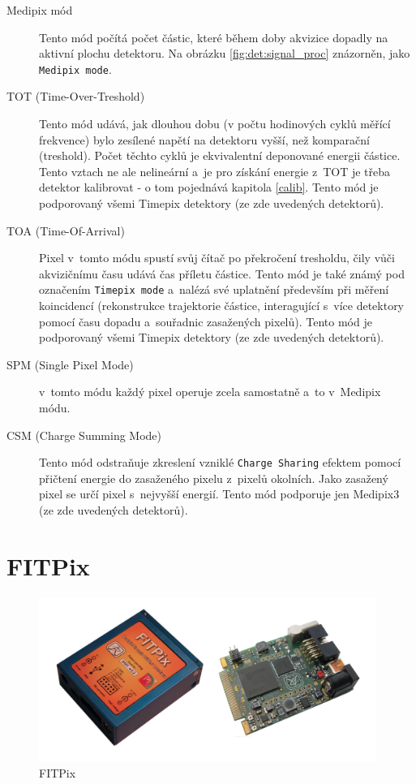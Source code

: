 \begin{description}
	\item[Medipix mód] Tento mód počítá počet částic, které během doby akvizice dopadly na aktivní plochu detektoru. Na obrázku \ref{fig:det:signal_proc} znázorněn, jako \texttt{Medipix mode}.
	\item[TOT (Time-Over-Treshold)] Tento mód udává, jak dlouhou dobu (v počtu hodinových cyklů měřící frekvence) bylo zesílené napětí na detektoru vyšší, než komparační (treshold). Počet těchto cyklů je ekvivalentní deponované energii částice. Tento vztach ne ale nelineární a~je pro získání energie z~TOT je třeba detektor kalibrovat - o tom pojednává kapitola \ref{calib}. Tento mód je podporovaný všemi Timepix detektory (ze zde uvedených detektorů).
	\item[TOA (Time-Of-Arrival)] Pixel v~tomto módu spustí svůj čítač po překročení tresholdu, čily vůči akvizičnímu času udává čas příletu částice. Tento mód je také známý pod označením \texttt{Timepix mode} a~nalézá své uplatnění především při měření koincidencí (rekonstrukce trajektorie částice, interagující s~více detektory pomocí času dopadu a~souřadnic zasažených pixelů). Tento mód je podporovaný všemi Timepix detektory (ze zde uvedených detektorů).
	\item[SPM (Single Pixel Mode)] v~tomto módu každý pixel operuje zcela samostatně a~to v~Medipix módu.
	\item[CSM (Charge Summing Mode)]\label{det:mod:csm} Tento mód odstraňuje zkreslení vzniklé \texttt{Charge Sharing} efektem pomocí přičtení energie do zasaženého pixelu z~pixelů okolních. Jako zasažený pixel se určí pixel s~nejvyšší energií. Tento mód podporuje jen Medipix3 (ze zde uvedených detektorů).

\end{description}

\section{FITPix}\label{det:fitpix}

\begin{figure}[th!]
	\begin{center}
		\includegraphics[width=11cm]{figures/fitpix.png}
		\caption{FITPix}
		\label{fig:det:fitpix}
	\end{center}
\end{figure}

